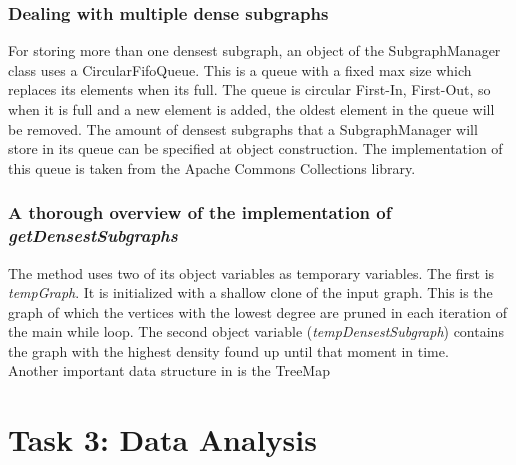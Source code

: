 \documentclass[10pt,a4paper]{article}
\begin{document}
\subsubsection{Dealing with multiple dense subgraphs}
For storing more than one densest subgraph, an object of the SubgraphManager class uses a CircularFifoQueue. This is a queue with a fixed max size which replaces its elements when its full. The queue is circular First-In, First-Out, so when it is full and a new element is added, the oldest element in the queue will be removed. The amount of densest subgraphs that a SubgraphManager will store in its queue can be specified at object construction. The implementation of this queue is taken from the Apache Commons Collections library.
\subsubsection{A thorough overview of the implementation of \emph{getDensestSubgraphs}}
The method uses two of its object variables as temporary variables. The first is \emph{tempGraph}. It is initialized with a shallow clone of the input graph. This is the graph of which the vertices with the lowest degree are pruned in each iteration of the main while loop. The second object variable (\emph{tempDensestSubgraph}) contains the graph with the highest density found up until that moment in time.\\
Another important data structure in is the TreeMap 



\section{Task 3: Data Analysis}
\end{document}
